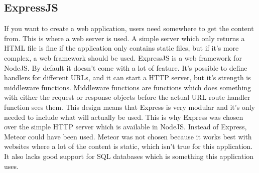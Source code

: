 \subsection{ExpressJS}
If you want to create a web application, users need somewhere to get the content from. This is where a web server is used. A simple server which only returns a HTML file is fine if the application only contains static files, but if it's more complex, a web framework should be used. ExpressJS is a web framework for NodeJS. By default it doesn't come with a lot of feature. It's possible to define handlers for different URLs, and it can start a HTTP server, but it's strength is middleware functions. Middleware functions are functions which does something with either the request or response objects before the actual URL route handler function sees them. This design means that Express is very modular and it's only needed to include what will actually be used. This is why Express was chosen over the simple HTTP server which is available in NodeJS. Instead of Express, Meteor could have been used. Meteor was not chosen because it works best with websites where a lot of the content is static, which isn't true for this application. It also lacks good support for SQL databases which is something this application uses.
